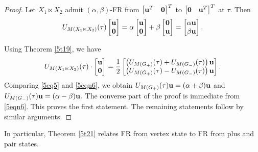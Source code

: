 \documentclass[12pt,a4paper]{article}
\def \u {{\bf u}}
\def \v {{\bf v}}
\newcommand{\ob}[1]{\left(#1\right)}
\newcommand{\tb}[1]{\left[#1\right]}
\begin{document}
\begin{proof}
  Let $X_1\ltimes X_2$ admit $(\alpha,\beta)$-FR from $\tb{\u^T\quad\mathbf{0}}^T$ to $\tb{\mathbf{0}\quad\u^T}^T$ at $\tau.$ Then  
  \begin{equation}\label{5eq5}
      U_{M(X_1\ltimes X_2)}(\tau) \begin{bmatrix}
    \u \\ \mathbf{0}
\end{bmatrix}=\alpha \begin{bmatrix}
    \u \\ \mathbf{0}
\end{bmatrix}+\beta \begin{bmatrix}
   \mathbf{0} \\ \u
\end{bmatrix}=\begin{bmatrix}
      \alpha\u \\ \beta\u
  \end{bmatrix}.
  \end{equation}

Using Theorem \ref{5t19}, we have 
  \begin{equation}\label{5eqn6}
      U_{M({X_1\ltimes X_2})}(\tau)\cdot \begin{bmatrix}
    \u \\ \mathbf{0}
\end{bmatrix}=\frac{1}{2}\begin{bmatrix}
    \ob{U_{M(G_+)}(\tau)+U_{M(G_-)}(\tau)}\u \\ \ob{U_{M(G_+)}(\tau)-U_{M(G_-)}(\tau)}\u
\end{bmatrix}
.\end{equation}
Comparing \eqref{5eq5} and \eqref{5eqn6}, we obtain $U_{M(G_+)}(\tau)\u=(\alpha+\beta)\u$ and $U_{M(G_-)}(\tau)\u=(\alpha-\beta)\u.$
The converse part of the proof is immediate from \eqref{5eqn6}. This proves the first statement. The remaining statements follow by similar arguments.
\end{proof}
In particular, Theorem \ref{5t21}  relates FR from vertex state to FR from plus and pair states.
\end{document}
